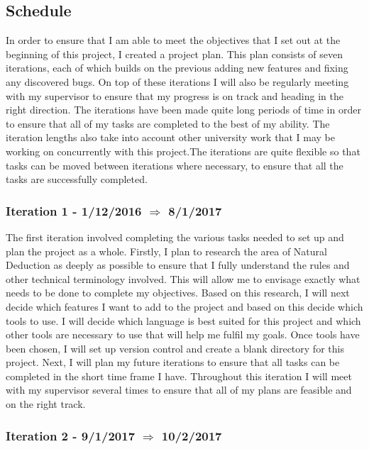 \subsection{Schedule \label{schedule}}

In order to ensure that I am able to meet the objectives that I set out at the beginning of this project, I created a project plan. This plan consists of seven iterations, each of which builds on the previous adding new features and fixing any discovered bugs. On top of these iterations I will also be regularly meeting with my supervisor to ensure that my progress is on track and heading in the right direction. The iterations have been made quite long periods of time in order to ensure that all of my tasks are completed to the best of my ability. The iteration lengths also take into account other university work that I may be working on concurrently with this project.The iterations are quite flexible so that tasks can be moved between iterations where necessary, to ensure that all the tasks are successfully completed. 


\subsubsection{Iteration 1 - 1/12/2016 $\Rightarrow$ 8/1/2017}

The first iteration involved completing the various tasks needed to set up and plan the project as a whole. Firstly, I plan to research the area of Natural Deduction as deeply as possible to ensure that I fully understand the rules and other technical terminology involved. This will allow me to envisage exactly what needs to be done to complete my objectives. Based on this research, I will next decide which features I want to add to the project and based on this decide which tools to use. I will decide which language is best suited for this project and which other tools are necessary to use that will help me fulfil my goals. Once tools have been chosen, I will set up version control and create a blank directory for this project. Next, I will plan my future iterations to ensure that all tasks can be completed in the short time frame I have. Throughout this iteration I will meet with my supervisor several times to ensure that all of my plans are feasible and on the right track.

\subsubsection{Iteration 2 - 9/1/2017 $\Rightarrow$ 10/2/2017}

